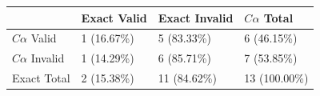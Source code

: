 \begin{tabular}{llll}
\toprule
 & Exact Valid & Exact Invalid & $C\alpha$ Total \\
\midrule
$C\alpha$ Valid & 1 (16.67\%) & 5 (83.33\%) & 6 (46.15\%) \\
$C\alpha$ Invalid & 1 (14.29\%) & 6 (85.71\%) & 7 (53.85\%) \\
Exact Total & 2 (15.38\%) & 11 (84.62\%) & 13 (100.00\%) \\
\bottomrule
\end{tabular}
